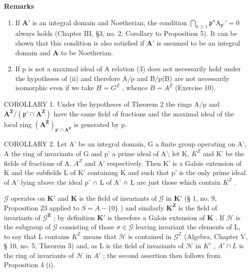 \textbf{Remarks}\par

\begin{enumerate}
\def\labelenumi{(\arabic{enumi})}
\setcounter{enumi}{2}
\item
  If \(\mathbf{A}'\) is an integral domain and Noetherian, the condition \(\bigcap_{n\geqslant 1}\mathfrak{p}^n\mathrm{A}_{\mathfrak{p}'}' = 0\) always holds (Chapter III, §3, no. 2, Corollary to Proposition 5). It can be shown that this condition is also satisfied if \(\mathbf{A}'\) is assumed to be an integral domain and \(\mathbf{A}\) to be Noetherian.
\item
  If p is not a maximal ideal of A relation (3) does not necessarily hold under the hypotheses of (ii) and therefore A/p and B/p(B) are not necessarily isomorphic even if we take \(H = G^{Z}\) , whence \(B = A^{Z}\) (Exercise 10).
\end{enumerate}

COROLLARY 1. Under the hypotheses of Theorem 2 the rings A/p and \(\mathbf{A}^{\mathbf{Z}} / (\mathfrak{p}'\cap \mathbf{A}^{\mathbf{Z}})\) have the same field of fractions and the maximal ideal of the local ring \((\mathbf{A}^{\mathbf{Z}})_{\mathfrak{p}'\cap \mathbf{A}^{\mathbf{Z}}}\) is generated by p.

COROLLARY 2. Let A' be an integral domain, G a finite group operating on A', A the ring of invariants of G and p' a prime ideal of A'; let K, \(K^{Z}\) and K' be the fields of fractions of A, \(A^{Z}\) and A' respectively. Then K' is a Galois extension of K and the subfields L of K' containing K and such that p' is the only prime ideal of A' lying above the ideal p' ∩ L of A' ∩ L are just those which contain \(K^{Z}\) .

\(\mathcal{G}\) operates on \(\mathbf{K}'\) and \(\mathbf{K}\) is the field of invariants of \(\mathcal{G}\) in \(\mathbf{K}'\) (§ 1, no. 9, Proposition 23 applied to \(S = A - \{0\}\) ) and similarly \(\mathbf{K}^{\mathbf{Z}}\) is the field of invariants of \(\mathcal{G}^{\mathbf{Z}}\) ; by definition \(\mathbf{K}'\) is therefore a Galois extension of \(\mathbf{K}\) . If \(\mathcal{H}\) is the subgroup of \(\mathcal{G}\) consisting of those \(\sigma \in \mathcal{G}\) leaving invariant the elements of L, to say that L contains \(K^{\mathbb{Z}}\) means that \(\mathcal{H}\) is contained in \(\mathcal{G}^{\mathbb{Z}}\) (Algebra, Chapter V, § 10, no. 5, Theorem 3) and, as L is the field of invariants of \(\mathcal{H}\) in \(K'\) , \(A' \cap L\) is the ring of invariants of \(\mathcal{H}\) in \(A'\) ; the second assertion then follows from Proposition 4 (i).

